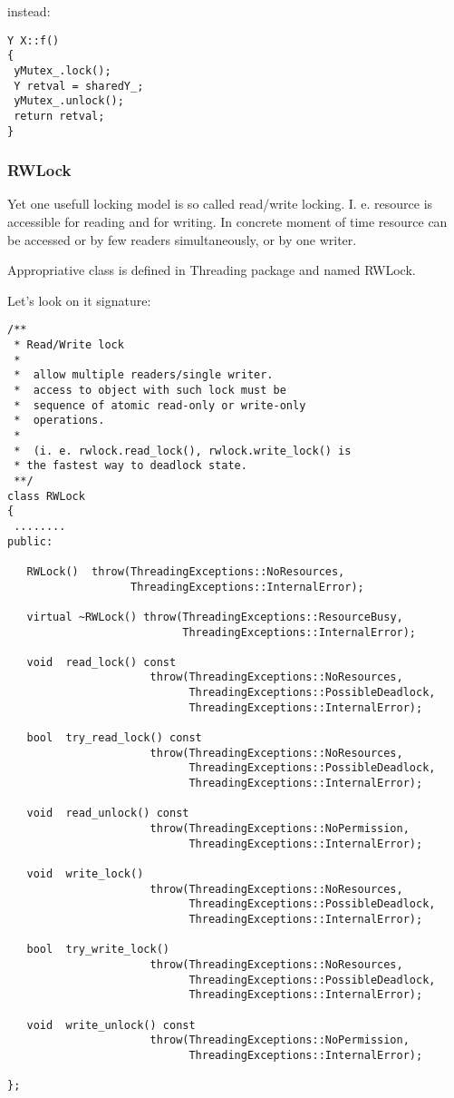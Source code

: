 \documentclass[10pt]{article}
\begin{document}
 instead:

\begin{verbatim}
Y X::f() 
{
 yMutex_.lock();
 Y retval = sharedY_;
 yMutex_.unlock();
 return retval;
}
\end{verbatim}


\subsubsection{ RWLock } 

 Yet one usefull  locking model is so called read/write locking.
I. e. resource is accessible for reading and for writing. 
In concrete moment of time resource can be accessed or by few readers
simultaneously, or by one writer.

 Appropriative class is defined in Threading package and named RWLock.

Let's look on it signature:

\begin{verbatim}
/**
 * Read/Write lock
 * 
 *  allow multiple readers/single writer.
 *  access to object with such lock must be 
 *  sequence of atomic read-only or write-only
 *  operations.
 *
 *  (i. e. rwlock.read_lock(), rwlock.write_lock() is
 * the fastest way to deadlock state.
 **/
class RWLock
{
 ........
public:

   RWLock()  throw(ThreadingExceptions::NoResources,
                   ThreadingExceptions::InternalError);

   virtual ~RWLock() throw(ThreadingExceptions::ResourceBusy,
                           ThreadingExceptions::InternalError);

   void  read_lock() const
                      throw(ThreadingExceptions::NoResources,
                            ThreadingExceptions::PossibleDeadlock,
                            ThreadingExceptions::InternalError);

   bool  try_read_lock() const
                      throw(ThreadingExceptions::NoResources,
                            ThreadingExceptions::PossibleDeadlock,
                            ThreadingExceptions::InternalError);

   void  read_unlock() const
                      throw(ThreadingExceptions::NoPermission,
                            ThreadingExceptions::InternalError);

   void  write_lock()
                      throw(ThreadingExceptions::NoResources,
                            ThreadingExceptions::PossibleDeadlock,
                            ThreadingExceptions::InternalError);

   bool  try_write_lock()
                      throw(ThreadingExceptions::NoResources,
                            ThreadingExceptions::PossibleDeadlock,
                            ThreadingExceptions::InternalError);

   void  write_unlock() const
                      throw(ThreadingExceptions::NoPermission,
                            ThreadingExceptions::InternalError);

};
\end{verbatim}
\end{document}
